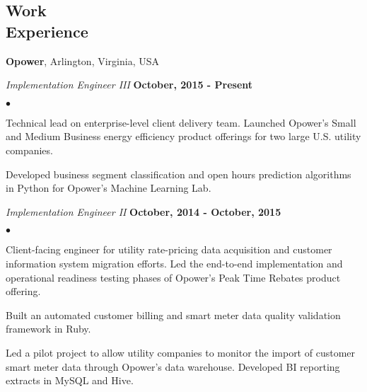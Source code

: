 \documentclass[margin,line]{res}
\newenvironment{list2}{
  \begin{list}{$\bullet$}{%
      \setlength{\itemsep}{0in}
      \setlength{\parsep}{0in} \setlength{\parskip}{0in}
      \setlength{\topsep}{0in} \setlength{\partopsep}{0in}
      \setlength{\leftmargin}{0.2in}}}{\end{list}}
\begin{document}
\begin{resume}
\section{\sc Work \\ Experience}

{\bf Opower}, Arlington, Virginia, USA

\vspace{-.3cm}
{\em Implementation Engineer III} \hfill {\bf October, 2015 - Present}\\

\vspace*{-5mm}
\vspace*{2mm}
\begin{list2}
\item Technical lead on enterprise-level client delivery team.
  Launched Opower's Small and Medium Business
  energy efficiency product offerings for two large U.S. utility
  companies.
\item Developed business segment classification and open hours
  prediction algorithms in Python for Opower's Machine Learning Lab.
\end{list2}
\vspace{-.3cm}
{\em Implementation Engineer II} \hfill {\bf October, 2014 - October, 2015}\\

\vspace*{-5mm}
\vspace*{2mm}
\begin{list2}
\item Client-facing engineer for utility rate-pricing data acquisition
  and customer information system migration efforts. Led the
  end-to-end implementation and operational readiness testing phases
  of Opower's Peak Time Rebates product offering.
\item Built an automated customer billing and smart meter data quality
  validation framework in Ruby.
\item Led a pilot project to allow utility companies to monitor the
  import of customer smart meter data through Opower's data warehouse.
  Developed BI reporting extracts in MySQL and Hive.

\end{list2}


\end{resume}
\end{document}
